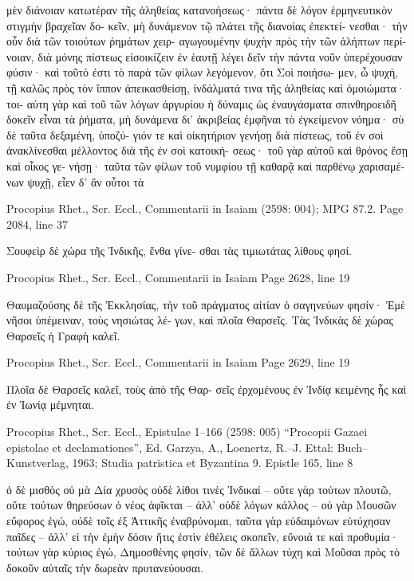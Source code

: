 \documentclass[12pt,letterpaper,twoside,final]{memoir}
\begin{document}
\begin{greek}
μὲν διάνοιαν κατωτέραν τῆς ἀληθείας κατανοήσεως· 
πάντα δὲ λόγον ἑρμηνευτικὸν στιγμὴν βραχεῖαν δο-
κεῖν, μὴ δυνάμενον τῷ πλάτει τῆς διανοίας ἐπεκτεί-
νεσθαι· τὴν οὖν διὰ τῶν τοιούτων ῥημάτων χειρ-
αγωγουμένην ψυχὴν πρὸς τὴν τῶν ἀλήπτων περί-
νοιαν, διὰ μόνης πίστεως εἰσοικίζειν ἐν ἑαυτῇ λέγει 
δεῖν τὴν πάντα νοῦν ὑπερέχουσαν φύσιν· καὶ τοῦτό 
ἐστι τὸ παρὰ τῶν φίλων λεγόμενον, ὅτι Σοὶ ποιήσω-
μεν, ὦ ψυχὴ, τῇ καλῶς πρὸς τὸν ἵππον ἀπεικασθείσῃ, 
ἰνδάλματά τινα τῆς ἀληθείας καὶ ὁμοιώματα· τοι-
αύτη γὰρ καὶ τοῦ τῶν λόγων ἀργυρίου ἡ δύναμις   
ὡς ἐναυγάσματα σπινθηροειδῆ δοκεῖν εἶναι τὰ 
ῥήματα, μὴ δυνάμενα δι' ἀκριβείας ἐμφῆναι τὸ 
ἐγκείμενον νόημα· σὺ δὲ ταῦτα δεξαμένη, ὑποζύ-
γιόν τε καὶ οἰκητήριον γενήσῃ διὰ πίστεως, τοῦ ἐν 
σοὶ ἀνακλίνεσθαι μέλλοντος διὰ τῆς ἐν σοὶ κατοική-
σεως· τοῦ γὰρ αὐτοῦ καὶ θρόνος ἔσῃ καὶ οἶκος γε-
νήσῃ· ταῦτα τῶν φίλων τοῦ νυμφίου τῇ καθαρᾷ καὶ 
παρθένῳ χαρισαμένων ψυχῇ, εἶεν δ' ἂν οὗτοι τὰ 




Procopius Rhet., Scr. Eccl., Commentarii in Isaiam (2598: 004); MPG 87.2.
Page 2084, line 37

           Σουφεὶρ δὲ χώρα τῆς Ἰνδικῆς, ἔνθα γίνε-
σθαι τὰς τιμιωτάτας λίθους φησί. 



Procopius Rhet., Scr. Eccl., Commentarii in Isaiam 
Page 2628, line 19

                                   Θαυμαζούσης δὲ τῆς 
Ἐκκλησίας, τὴν τοῦ πράγματος αἰτίαν ὁ σαγηνεύων 
φησίν· Ἐμὲ νῆσοι ὑπέμειναν, τοὺς νησιώτας λέ-
γων, καὶ πλοῖα Θαρσεῖς. Τὰς Ἰνδικὰς δὲ χώρας 
Θαρσεῖς ἡ Γραφὴ καλεῖ. 



Procopius Rhet., Scr. Eccl., Commentarii in Isaiam 
Page 2629, line 19

Πλοῖα δὲ Θαρσεῖς καλεῖ, τοὺς ἀπὸ τῆς Θαρ-
σεῖς ἐρχομένους ἐν Ἰνδίᾳ κειμένης ἧς καὶ ἐν 
Ἰωνίᾳ μέμνηται. 



Procopius Rhet., Scr. Eccl., Epistulae 1–166 (2598: 005)
“Procopii Gazaei epistolae et declamationes”, Ed. Garzya, A., Loenertz, R.–J.
Ettal: Buch–Kunstverlag, 1963; Studia patristica et Byzantina 9.
Epistle 165, line 8

                               ὁ δὲ μισθὸς οὐ μὰ Δία χρυσὸς οὐδὲ λίθοι τινὲς 
Ἰνδικαί – οὔτε γὰρ τούτων πλουτῶ, οὔτε τούτων θηρεύσων ὁ νέος ἀφῖκται 
– ἀλλ' οὐδὲ λόγων κάλλος – οὐ γὰρ Μουσῶν εὔφορος ἐγώ, οὐδὲ τοῖς ἐξ 
Ἀττικῆς ἐναβρύνομαι, ταῦτα γὰρ εὐδαιμόνων εὐτύχησαν παῖδες – ἀλλ' εἰ 
τὴν ἐμὴν δόσιν ἥτις ἐστὶν ἐθέλεις σκοπεῖν, εὔνοιά τε καὶ προθυμία· τούτων 
γὰρ κύριος ἐγώ, Δημοσθένης φησίν, τῶν δὲ ἄλλων τύχη καὶ Μοῦσαι πρὸς 
τὸ δοκοῦν αὐταῖς τὴν δωρεὰν πρυτανεύουσαι. 




\end{greek}
\end{document}
